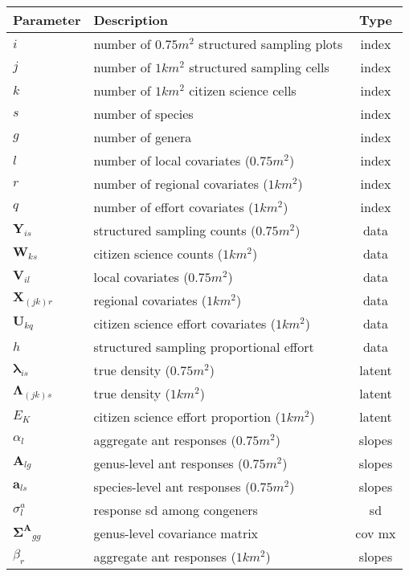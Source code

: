 \documentclass[10pt,a4paper,draft]{article}
\begin{document}
\begin{center}
  \begin{tabular}{ l l c }
    \hline
    \textbf{Parameter} & \textbf{Description} & \textbf{Type} \\
    \hline
    $i$ & number of $0.75 m^2$ structured sampling plots & index \\
    $j$ & number of $1 km^2$ structured sampling cells & index \\
    $k$ & number of $1 km^2$ citizen science cells & index \\
    $s$ & number of species & index \\
    $g$ & number of genera & index \\
    $l$ & number of local covariates ($0.75 m^2$) & index \\
    $r$ & number of regional covariates ($1 km^2$) & index \\
    $q$ & number of effort covariates ($1 km^2$) & index \\
    \hline
    $\mathbf{Y}_{is}$ & structured sampling counts ($0.75 m^2$) & data \\
    $\mathbf{W}_{ks}$ & citizen science counts ($1 km^2$) & data \\
    $\mathbf{V}_{il}$ & local covariates ($0.75 m^2$) & data \\
    $\mathbf{X}_{(jk)r}$ & regional covariates ($1 km^2$) & data \\
    $\mathbf{U}_{kq}$ & citizen science effort covariates ($1 km^2$) & data \\
    $h$ & structured sampling proportional effort & data \\
    \hline
    $\mathbf{\lambda}_{is}$ & true density ($0.75 m^2$) & latent \\
    $\mathbf{\Lambda}_{(jk)s}$ & true density ($1 km^2$) & latent \\
    $E_{K}$ & citizen science effort proportion ($1 km^2$) & latent \\
    \hline
    $\alpha_{l}$ & aggregate ant responses ($0.75 m^2$) & slopes \\
    $\mathbf{A}_{lg}$ & genus-level ant responses ($0.75 m^2$) & slopes \\
    $\mathbf{a}_{ls}$ & species-level ant responses ($0.75 m^2$) & slopes \\
    $\sigma^a_{l}$ & response sd among congeners & sd \\
    $\mathbf{\Sigma^A}_{gg}$ & genus-level covariance matrix & cov mx \\
    $\beta_{r}$ & aggregate ant responses ($1 km^2$) & slopes \\

\end{tabular}
\end{center}
\end{document}
